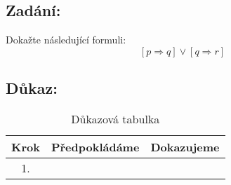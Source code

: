 \documentclass{article}
\begin{document}
\subsection{Zadání:}

Dokažte následující formuli:
$$[p \Rightarrow q] \lor [q \Rightarrow r]$$

\subsection{Důkaz:}

\begin{table}[H]\centering

    \caption{Důkazová tabulka}

\begin{tabular}{|c|c|c|}
    
    
        \hline \textbf{Krok} & \textbf{Předpokládáme} & \textbf{Dokazujeme} \\ \hline \hline
    	1. &  & \\ \hline
            
    	\end{tabular}
\end{table}
\end{document}
